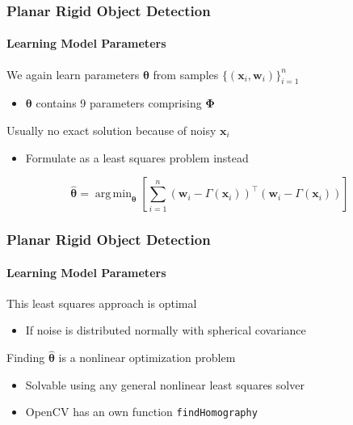 \documentclass[xetex,professionalfont]{beamer}
\DeclareMathOperator*{\argmin}{arg\,min}
\renewcommand{\vec}[1]{\ensuremath{\mathbf{#1}}}
\newcommand{\vw}{\vec{w}}
\newcommand{\vx}{\vec{x}}
\newcommand{\bth}{\boldsymbol{\theta}}
\renewcommand\emph[1]{\textcolor{tuwcvl_inf_red}{#1}}
\begin{document}

\begin{frame}
\frametitle{Planar Rigid Object Detection}
\framesubtitle{Learning Model Parameters}

We again learn parameters $\bth$ from samples $\{(\vx_i,\vw_i)\}_{i=1}^n$
\begin{itemize}
	\item $\bth$ contains 9 parameters comprising $\boldsymbol{\Phi}$ %
\end{itemize}

\bigskip
Usually no exact solution because of noisy $\vx_i$
\begin{itemize}
	\item Formulate as a \emph{least squares problem} instead
\end{itemize}

\[
	\hat{\bth}=\argmin_{\bth} \left[\sum_{i=1}^n (\vw_i-\Gamma(\vx_i))^\top(\vw_i-\Gamma(\vx_i)) \right]
\]

\end{frame}


\begin{frame}
\frametitle{Planar Rigid Object Detection}
\framesubtitle{Learning Model Parameters}

This least squares approach is optimal
\begin{itemize}
	\item If noise is distributed normally with spherical covariance %
\end{itemize}

\bigskip
Finding $\hat{\bth}$ is a nonlinear optimization problem
\begin{itemize}
	\item Solvable using any general nonlinear least squares solver %
	\item OpenCV has an own function \texttt{findHomography}
\end{itemize}

\end{frame}

\end{document}
